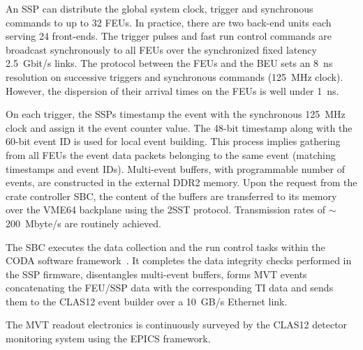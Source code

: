 An SSP can distribute the global system clock, trigger and synchronous commands to up to 32 FEUs. In practice, there are two back-end units each serving 24 front-ends. The trigger pulses and fast run control commands are broadcast synchronously to all FEUs over the synchronized fixed latency 2.5~Gbit/s links. The protocol between the FEUs and the BEU sets an 8~ns resolution on successive triggers and synchronous commands (125~MHz clock). However, the dispersion of their arrival times on the FEUs is well under 1~ns.

On each trigger, the SSPs timestamp the event with the synchronous 125~MHz clock and assign it the event counter value. The 48-bit timestamp along with the 60-bit event ID is used for local event building. This process implies gathering from all FEUs the event data packets belonging to the same event (matching timestamps and event IDs). Multi-event buffers, with programmable number of events, are constructed in the external DDR2 memory. Upon the request from the crate controller SBC, the content of the buffers are transferred to its memory over the VME64 backplane using the 2SST protocol. Transmission rates of $\sim$200~Mbyte/s are routinely achieved.

The SBC executes the data collection and the run control tasks within the CODA software framework~\cite{CODA}. It completes the data integrity checks performed in the SSP firmware, disentangles multi-event buffers, forms MVT events concatenating the FEU/SSP data with the corresponding TI data and sends them to the CLAS12 event builder over a 10~GB/s Ethernet link.

The MVT readout electronics is continuously surveyed by the CLAS12 detector monitoring system using the EPICS framework.

